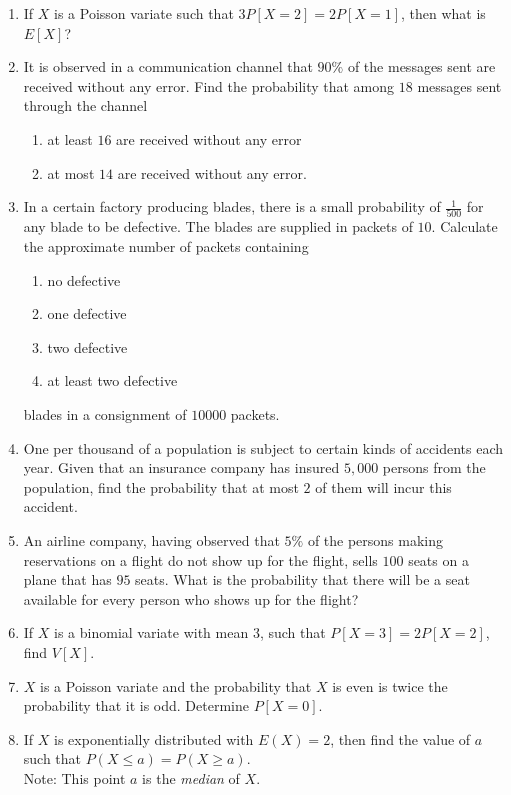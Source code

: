\documentclass[svgnames]{amsart}
\begin{document}
\begin{enumerate}[leftmargin=*]
\item If $X$ is a Poisson variate such that $3 P[X = 2] = 2P[X = 1]$, then what is $E[X]$?

\item  It is observed in a communication channel that $90\%$ of the messages sent are received without any error. Find the probability that among $18$ messages sent through the channel
\begin{enumerate}[label=(\roman*)]
	\item at least $16$ are received without any error
	\item at most $14$ are received without any error.
\end{enumerate}

\item In a certain factory producing blades, there is a small probability of $\frac{1}{500}$ for any blade to be defective. The blades are supplied in packets of $10$. Calculate the approximate number of packets containing
\begin{enumerate}[label=(\roman*)]
	\item no defective
	\item one defective
	\item two defective
	\item at least two defective
\end{enumerate}
blades in a consignment of $10000$ packets.

\item One per thousand of a population is subject to certain kinds of accidents each year. Given that an insurance company has insured $5,000$ persons from the population, find the probability that at most $2$ of them will incur this accident.

\item An airline company, having observed that $5\%$ of the persons making reservations on a flight do not show up for the flight, sells $100$ seats on a plane that has $95$ seats. What is the probability that there will be a seat available for every person who shows up for the flight?

\item If $X$ is a binomial variate with mean $3$, such that $P[X = 3] = 2P[X = 2]$, find $V[X]$.

\item $X$ is a Poisson variate and the probability that $X$ is even is twice the probability that it is odd. Determine $P[X = 0]$.

\item  If $X$ is exponentially distributed with $E(X) = 2$, then find the value of $a$ such that $P(X \le a) = P(X \ge a)$.\\
{\small\color{blue!40!black}
		Note: This point $a$ is the \emph{median} of $X$.
}


\end{enumerate}
\end{document}
